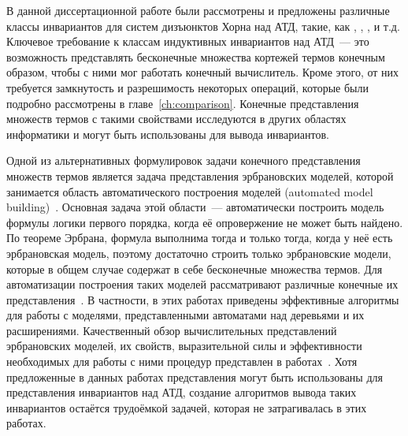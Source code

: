 В данной диссертационной работе были рассмотрены и предложены различные классы инвариантов для систем дизъюнктов Хорна над АТД, такие, как \elemclass{}, \regclass{}, \syncRegFlatClass{}, \syncRegFullClass{} и т.\:д. Ключевое требование к классам индуктивных инвариантов над АТД~--- это возможность представлять бесконечные множества кортежей термов конечным образом, чтобы с ними мог работать конечный вычислитель. Кроме этого, от них требуется замкнутость и разрешимость некоторых операций, которые были подробно рассмотрены в главе~\ref{ch:comparison}. Конечные представления множеств термов с такими свойствами исследуются в других областях информатики и могут быть использованы для вывода инвариантов.

Одной из альтернативных формулировок задачи конечного представления множеств термов является задача представления эрбрановских моделей, которой занимается область автоматического построения моделей (automated model building)~\cite{caferra2013automated}. Основная задача этой области~--- автоматически построить модель формулы логики первого порядка, когда её опровержение не может быть найдено. По теореме Эрбрана, формула выполнима тогда и только тогда, когда у неё есть эрбрановская модель, поэтому достаточно строить только эрбрановские модели, которые в общем случае содержат в себе бесконечные множества термов. Для автоматизации построения таких моделей рассматривают различные конечные их представления~\cite{fermuller2007model,fermuller2005model,teucke2019expressivity,gramlich2002algorithmic}. В частности, в этих работах приведены эффективные алгоритмы для работы с моделями, представленными автоматами над деревьями и их расширениями. Качественный обзор вычислительных представлений эрбрановских моделей, их свойств, выразительной силы и эффективности необходимых для работы с ними процедур представлен в работах~\cite{matzinger1998computational, matzinger2000computational}. Хотя предложенные в данных работах представления могут быть использованы для представления инвариантов над АТД, создание алгоритмов вывода таких инвариантов остаётся трудоёмкой задачей, которая не затрагивалась в этих работах.

